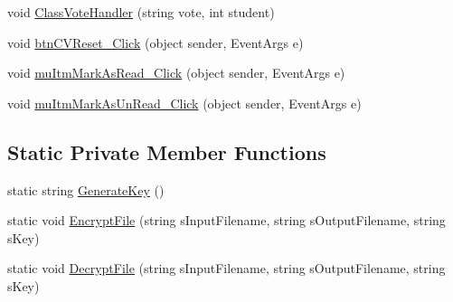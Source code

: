 \begin{DoxyCompactItemize}
void \hyperlink{class_sr_p___classroom_inq_1_1frm_classrrom_inq_ae1f8913d324d1be6740be0d839b3fbf2}{\-Class\-Vote\-Handler} (string vote, int student)
\item 
void \hyperlink{class_sr_p___classroom_inq_1_1frm_classrrom_inq_a029901904e102f3d9168a7779e43ec48}{btn\-C\-V\-Reset\-\_\-\-Click} (object sender, \-Event\-Args e)
\item 
void \hyperlink{class_sr_p___classroom_inq_1_1frm_classrrom_inq_a9e78ca4cfbab725c9ff4ed2e804cfff7}{mu\-Itm\-Mark\-As\-Read\-\_\-\-Click} (object sender, \-Event\-Args e)
\item 
void \hyperlink{class_sr_p___classroom_inq_1_1frm_classrrom_inq_a0f7d0dbc357b6823f39b25e46842a86c}{mu\-Itm\-Mark\-As\-Un\-Read\-\_\-\-Click} (object sender, \-Event\-Args e)
\end{DoxyCompactItemize}
\subsection*{\-Static \-Private \-Member \-Functions}
\begin{DoxyCompactItemize}
\item 
static string \hyperlink{class_sr_p___classroom_inq_1_1frm_classrrom_inq_a08e314c225eb3c62963d0f268c656163}{\-Generate\-Key} ()
\item 
static void \hyperlink{class_sr_p___classroom_inq_1_1frm_classrrom_inq_a50670d50ceb8042c197d27b2ce179f36}{\-Encrypt\-File} (string s\-Input\-Filename, string s\-Output\-Filename, string s\-Key)
\item 
static void \hyperlink{class_sr_p___classroom_inq_1_1frm_classrrom_inq_a0655d5baf561da80816166c61c6605af}{\-Decrypt\-File} (string s\-Input\-Filename, string s\-Output\-Filename, string s\-Key)
\end{DoxyCompactItemize}
